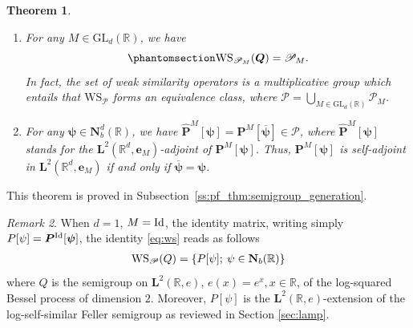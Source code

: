 \documentclass[12pt]{amsart}
\newcommand{\hlabel}{\phantomsection\label}
\newcommand{\hptg}[2]{\hypertarget{#1}{#2}}
\numberwithin{equation}{section}
\newcommand{\bb}{\mathbb}
\newcommand{\cc}{\mathcal}
\newcommand{\ccP}{\mathscr{P}}
\newcommand{\ov}{\overline}
\newcommand{\ttt}{\mathtt}
\newcommand{\bmrm}[2][2]{\mathbf{#2}^{#1}}
\newcommand{\FsemiM}{\bm{P}^M[\bm{\psi}]}
\newcommand{\FsemiMd}{\widehat{\bm{P}}^M[\bm{\psi}]}
\newcommand{\C}{\mathbf{C}}
\newcommand{\NN}{\mathbf{N}}
\newcommand{\f}{\mathbf{f}}
\newtheorem{thm}{Theorem}[section]
\theoremstyle{definition}
\theoremstyle{assump}
\theoremstyle{remark}
\newtheorem{rem}[thm]{Remark}
\begin{document}
\begin{thm}
\begin{enumerate}
More specifically,  for any ${\psi}\in \NN_+(\bb R)$, $A_\ttt{2}[\psi]$ is the closure of $(A_\ttt{PDO}[\psi],\Lambda_{\psi}(\C^\infty_c(\bb R))$, where $\Lambda_{\psi}\in  \mathscr{B}(\bmrm{L}(\bb{R},{e}))$ is defined in \eqref{eq:wsob}, and, otherwise, for any ${\psi}\in \NN_b(\bb R)\setminus \NN_+(\bb R)$, $\widehat{{P}}[{\psi}]={P}[{\ov{{\psi}}}]$. The general case is then obtained by tensorization and isomorphism of Hilbert spaces.
	\item \hlabel{it:ws_semigroups} %
For any $M\in\mathrm{GL}_d(\bb R)$, we have
\hptg{C16}{
	\begin{equation} \hlabel{eq:ws}
		\mathrm{WS}_{\ccP_M}(\bm{Q})=\ccP_M.      %
	\end{equation}}
In fact, the set of weak similarity operators is a multiplicative group which entails that $\mathrm{WS}_{\ccP}$ forms an equivalence class, where $\ccP=\bigcup_{M\in\mathrm{GL}_d(\bb R)}\ccP_M$. %
			\item \hlabel{it:thm2adj} For any $\bm\psi\in\NN^d_b(\bb R)$, we have $\FsemiMd=\bm{P}^{M}[\ov{\bm{\psi}}]\in \ccP$, where $\FsemiMd$ stands for  the $\bmrm{L}(\bb{R}^d,{\mathbf{e}}_M)$-adjoint of $\FsemiM$. Thus, $\FsemiM$ is self-adjoint in $\bmrm{L}(\bb{R}^d,{\mathbf{e}}_M)$ if and only if $\ov{\bm{\psi}}=\bm{\psi}$. \vspace{.2cm}
		\end{enumerate}
	
	\end{thm}
This theorem is proved in Subsection~\ref{ss:pf_thm:semigroup_generation}.
\begin{rem}
	When $d=1$, $M=\rm{Id}$, the identity matrix, writing simply $P[\psi]=\bm{P}^{\rm{Id}}[\bm{\psi}]$, the identity \eqref{eq:ws} reads as follows
	\begin{align}
		{\rm WS}_\ccP(Q)=\{P[\psi]; \: \psi\in\NN_b(\bb R)\}
	\end{align}
	where $Q$ is the semigroup on $\bmrm{L}(\bb{R},e)$, $e(x)=e^x, x \in \bb{R}$, of the log-squared Bessel process of dimension $2$. Moreover, $P[\psi]$ is the $\bmrm{L}(\bb{R},e)$-extension of the log-self-similar Feller semigroup as reviewed in Section \ref{sec:lamp}.
\end{rem}
\end{document}

